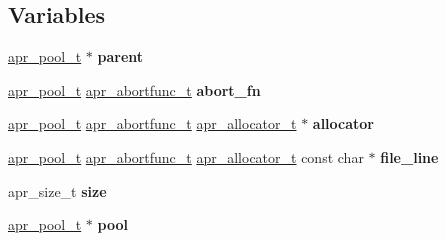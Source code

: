 \subsection*{Variables}
\begin{DoxyCompactItemize}
\item 
\mbox{\label{group__apr__pools_ga3eb8c52002440da9a3eed11d54d08dd5}} 
\mbox{\hyperlink{group__apr__pools_gaf137f28edcf9a086cd6bc36c20d7cdfb}{apr\+\_\+pool\+\_\+t}} $\ast$ {\bfseries parent}
\item 
\mbox{\label{group__apr__pools_gaf5a8821081b4fed18bef302377c796e4}} 
\mbox{\hyperlink{group__apr__pools_gaf137f28edcf9a086cd6bc36c20d7cdfb}{apr\+\_\+pool\+\_\+t}} \mbox{\hyperlink{group__apr__pools_ga370a939349adf6d1438068e2fc69a0dd}{apr\+\_\+abortfunc\+\_\+t}} {\bfseries abort\+\_\+fn}
\item 
\mbox{\label{group__apr__pools_ga3d4c7b6ba19a3b46b6fecdee3d867787}} 
\mbox{\hyperlink{group__apr__pools_gaf137f28edcf9a086cd6bc36c20d7cdfb}{apr\+\_\+pool\+\_\+t}} \mbox{\hyperlink{group__apr__pools_ga370a939349adf6d1438068e2fc69a0dd}{apr\+\_\+abortfunc\+\_\+t}} \mbox{\hyperlink{group__apr__allocator_ga1ceabfd30fcfc455e47d052d2a24244b}{apr\+\_\+allocator\+\_\+t}} $\ast$ {\bfseries allocator}
\item 
\mbox{\label{group__apr__pools_ga59ec09f08f4f92ffdd58dfcf1a230e66}} 
\mbox{\hyperlink{group__apr__pools_gaf137f28edcf9a086cd6bc36c20d7cdfb}{apr\+\_\+pool\+\_\+t}} \mbox{\hyperlink{group__apr__pools_ga370a939349adf6d1438068e2fc69a0dd}{apr\+\_\+abortfunc\+\_\+t}} \mbox{\hyperlink{group__apr__allocator_ga1ceabfd30fcfc455e47d052d2a24244b}{apr\+\_\+allocator\+\_\+t}} const char $\ast$ {\bfseries file\+\_\+line}
\item 
\mbox{\label{group__apr__pools_ga5f598d678d0ca77c25732a145c68d3c7}} 
apr\+\_\+size\+\_\+t {\bfseries size}
\item 
\mbox{\label{group__apr__pools_ga51fbc0d90e2519e2e42e03c5dd9f441b}} 
\mbox{\hyperlink{group__apr__pools_gaf137f28edcf9a086cd6bc36c20d7cdfb}{apr\+\_\+pool\+\_\+t}} $\ast$ {\bfseries pool}
\item 
\mbox{\label{group__apr__pools_ga1bbf7910f130dc8f35153f443e65931f}} 

\end{DoxyCompactItemize}
